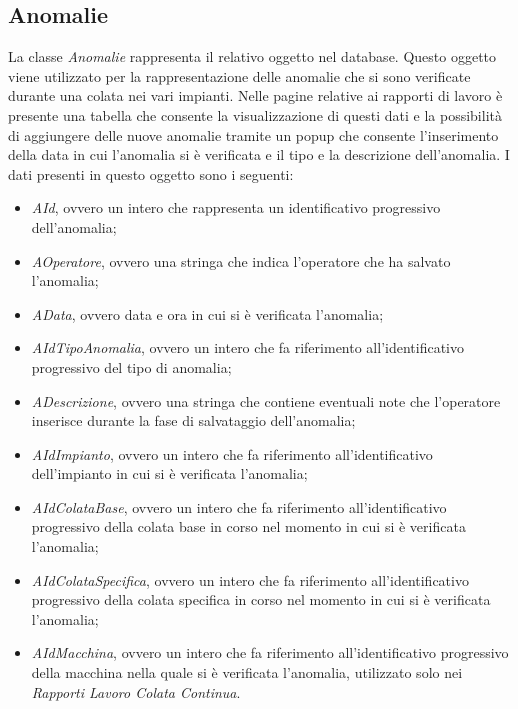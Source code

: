   \subsection{Anomalie}
  La classe \textit{Anomalie} rappresenta il relativo oggetto nel database. Questo oggetto viene utilizzato per la
  rappresentazione delle anomalie che si sono verificate durante una colata nei vari impianti. Nelle pagine relative
  ai rapporti di lavoro è presente una tabella che consente la visualizzazione di questi dati e la possibilità di aggiungere
  delle nuove anomalie tramite un popup che consente l'inserimento della data in cui l'anomalia si è verificata e 
  il tipo e la descrizione dell'anomalia. I dati presenti in questo oggetto sono i seguenti:
  \begin{itemize}
    \item \textit{AId}, ovvero un intero che rappresenta un identificativo progressivo dell'anomalia;
    \item \textit{AOperatore}, ovvero una stringa che indica l'operatore che ha salvato l'anomalia;
    \item \textit{AData}, ovvero data e ora in cui si è verificata l'anomalia;
    \item \textit{AIdTipoAnomalia}, ovvero un intero che fa riferimento all'identificativo progressivo del tipo di anomalia;
    \item \textit{ADescrizione}, ovvero una stringa che contiene eventuali note che l'operatore inserisce durante la
    fase di salvataggio dell'anomalia;
    \item \textit{AIdImpianto}, ovvero un intero che fa riferimento all'identificativo dell'impianto in cui si è verificata
    l'anomalia;
    \item \textit{AIdColataBase}, ovvero un intero che fa riferimento all'identificativo progressivo della colata base in corso
    nel momento in cui si è verificata l'anomalia;
    \item \textit{AIdColataSpecifica}, ovvero un intero che fa riferimento all'identificativo progressivo della colata specifica
    in corso nel momento in cui si è verificata l'anomalia;
    \item \textit{AIdMacchina}, ovvero un intero che fa riferimento all'identificativo progressivo della macchina nella quale
    si è verificata l'anomalia, utilizzato solo nei \textit{Rapporti Lavoro Colata Continua}.
  \end{itemize}
    

